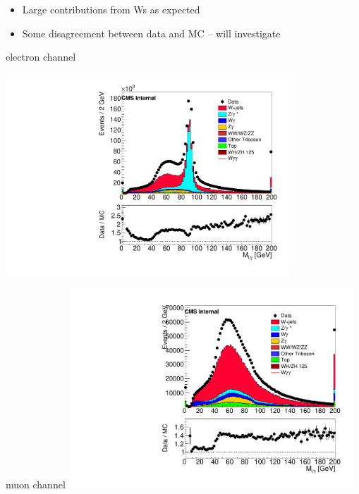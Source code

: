 \documentclass{beamer}
\begin{document}
 {


    \begin{itemize}
        \item Large contributions from Ws as expected
        \item Some disagreement between data and MC -- will investigate
    \end{itemize}

    \bc
     
         electron channel
             
         \includegraphics[width=0.8\textwidth]{Plots/m_lepph_1el1ph.pdf}



         muon channel
        \includegraphics[width=0.8\textwidth]{Plots/m_lepph_1mu1ph.pdf}

    \ec

}
\end{document}
